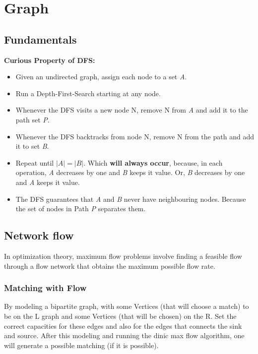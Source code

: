 \chapter{Graph}

\section{Fundamentals}

	\textbf{Curious Property of DFS:} 
	
	\begin{itemize}
	\item Given an undirected graph, assign each node to a set \textit{A}.
	\item Run a Depth-First-Search starting at any node.
	\item Whenever the DFS visits a new node N, remove N from \textit{A} and add it to the path set \textit{P}.
	\item Whenever the DFS backtracks from node N, remove N from the path and add it to set \textit{B}.
	\item Repeat until $|A| = |B|$. Which \textbf{will always occur}, because, in each operation, \textit{A} decreases by one and \textit{B} keeps it value. 
	Or, \textit{B} decreases by one and \textit{A} keeps it value.
	\item The DFS guarantees that \textit{A} and \textit{B} never have neighbouring nodes. 
	Because the set of nodes in Path \textit{P} separates them.
	\end{itemize}
	


\section{Network flow}

	In optimization theory, maximum flow problems involve finding a 
	feasible flow through a flow network that obtains the maximum possible flow rate. 

	

	\subsection{Matching with Flow}

		By modeling a bipartite graph, with some Vertices (that will choose a match) to be on the L graph and some Vertices (that will be chosen) on the R.
		Set the correct capacities for these edges and also for the edges that connects the sink and source. After this modeling
		and running the dinic max flow algorithm, one will generate a possible matching (if it is possible).

